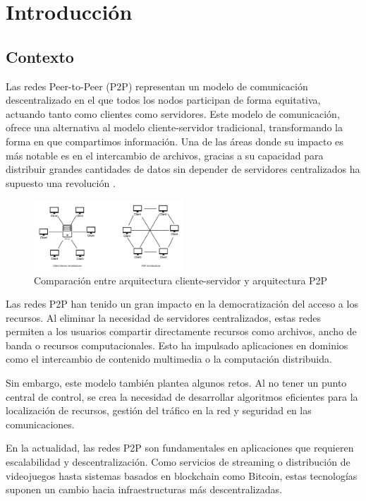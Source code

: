 \chapter{Introducción}
\label{cap:introduccion}


\section{Contexto}

Las redes Peer-to-Peer (P2P) representan un modelo de comunicación descentralizado en el que todos los nodos participan de forma equitativa, actuando tanto como clientes como servidores.
Este modelo de comunicación, ofrece una alternativa al modelo cliente-servidor tradicional, transformando la forma en que compartimos información.
Una de las áreas donde su impacto es más notable es en el intercambio de archivos, gracias a su capacidad para distribuir grandes cantidades de datos sin depender de servidores centralizados ha supuesto una revolución \cite{schollmeier2001}.

\begin{figure}[h]
    \centering
    \includegraphics[width = 0.5\textwidth]{Imagenes/Vectorial/client-server-vs-p2p}
    \caption{Comparaci\'on entre arquitectura cliente-servidor y arquitectura P2P}
    \label{fig:clientVsp2p}
\end{figure}


Las redes P2P han tenido un gran impacto en la democratización del acceso a los recursos.
Al eliminar la necesidad de servidores centralizados, estas redes permiten a los usuarios compartir directamente recursos como archivos, ancho de banda o recursos computacionales.
Esto ha impulsado aplicaciones en dominios como el intercambio de contenido multimedia o la computación distribuida.

Sin embargo, este modelo también plantea algunos retos.
Al no tener un punto central de control, se crea la necesidad de desarrollar algoritmos eficientes para la localización de recursos, gestión del tráfico en la red y seguridad en las comunicaciones.

En la actualidad, las redes P2P son fundamentales en aplicaciones que requieren escalabilidad y descentralización.
Como servicios de streaming o distribución de videojuegos hasta sistemas basados en blockchain como Bitcoin,
estas tecnologías suponen un cambio hacia infraestructuras más descentralizadas.


